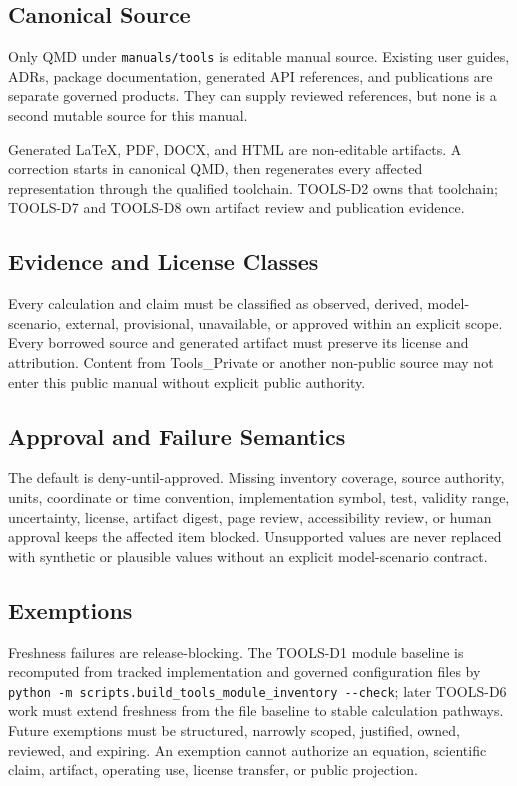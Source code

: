\documentclass[
  american,
]{article}
\newcounter{none} %
\begin{document}
\subsection{Canonical Source}\label{canonical-source}

Only QMD under \texttt{manuals/tools} is editable manual source.
Existing user guides, ADRs, package documentation, generated API
references, and publications are separate governed products. They can
supply reviewed references, but none is a second mutable source for this
manual.

Generated LaTeX, PDF, DOCX, and HTML are non-editable artifacts. A
correction starts in canonical QMD, then regenerates every affected
representation through the qualified toolchain. TOOLS-D2 owns that
toolchain; TOOLS-D7 and TOOLS-D8 own artifact review and publication
evidence.

\subsection{Evidence and License
Classes}\label{evidence-and-license-classes}

Every calculation and claim must be classified as observed, derived,
model-scenario, external, provisional, unavailable, or approved within
an explicit scope. Every borrowed source and generated artifact must
preserve its license and attribution. Content from Tools\_Private or
another non-public source may not enter this public manual without
explicit public authority.

\subsection{Approval and Failure
Semantics}\label{approval-and-failure-semantics}

The default is deny-until-approved. Missing inventory coverage, source
authority, units, coordinate or time convention, implementation symbol,
test, validity range, uncertainty, license, artifact digest, page
review, accessibility review, or human approval keeps the affected item
blocked. Unsupported values are never replaced with synthetic or
plausible values without an explicit model-scenario contract.

\subsection{Exemptions}\label{exemptions}

Freshness failures are release-blocking. The TOOLS-D1 module baseline is
recomputed from tracked implementation and governed configuration files
by
\texttt{python\ -m\ scripts.build\_tools\_module\_inventory\ -\/-check};
later TOOLS-D6 work must extend freshness from the file baseline to
stable calculation pathways. Future exemptions must be structured,
narrowly scoped, justified, owned, reviewed, and expiring. An exemption
cannot authorize an equation, scientific claim, artifact, operating use,
license transfer, or public projection.
\end{document}
